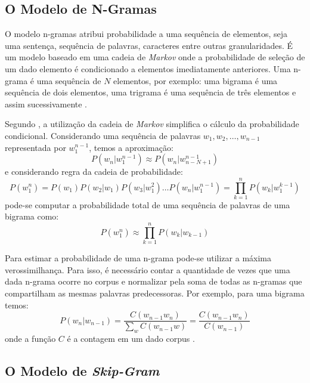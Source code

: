 \subsection{O Modelo de N-Gramas}
\label{sec:n-grama}

O modelo n-gramas atribui probabilidade a uma sequência de elementos, seja uma sentença, sequência de palavras, caracteres entre outras granularidades. É um modelo baseado em uma cadeia de \textit{Markov} onde a probabilidade de seleção de um dado elemento é condicionado a elementos imediatamente anteriores. Uma n-grama é uma sequência de $N$ elementos, por exemplo: uma bigrama é uma sequência de dois elementos, uma trigrama é uma sequência de três elementos e assim sucessivamente \cite{Jurafsky2009Speech}.

Segundo \textcite{Jurafsky2009Speech}, a utilização da cadeia de \textit{Markov} simplifica o cálculo da probabilidade condicional. Considerando uma sequência de palavras $w_1, w_2, \dots, w_{n-1}$ representada por $w_1^{n-1}$, temos a aproximação:
\begin{equation}
    \label{eq:n_gram_approximation}
    P(w_n|w_1^{n-1}) \approx P(w_n|w_{n-N+1}^{n-1})
\end{equation}
e considerando regra da cadeia de probabilidade:
\begin{equation}
    \label{eq:n_gram_chain_rule}
    P(w_1^n) = P(w_1) P(w_2|w_1) P(w_3|w_1^{2}) \dots P(w_n|w_1^{n-1}) = \prod_{k=1}^n P(w_k|w_1^{k-1})
\end{equation}
pode-se computar a probabilidade total de uma sequência de palavras de uma bigrama como:
\begin{equation}
    \label{eq:n_gram_bi_gram}
    P(w_1^n) \approx \prod_{k=1}^n P(w_k|w_{k-1})
\end{equation}

Para estimar a probabilidade de uma n-grama pode-se utilizar a máxima verossimilhança. Para isso, é necessário contar a quantidade de vezes que uma dada n-grama ocorre no corpus e normalizar pela soma de todas as n-gramas que compartilham as mesmas palavras predecessoras. Por exemplo, para uma bigrama temos:
\begin{equation}
    \label{eq:n_gram_bi_gram_probaility}
    P(w_n|w_{n-1}) = \frac{C(w_{n-1}w_n)}{\sum_w C(w_{n-1}w)} = \frac{C(w_{n-1}w_n)}{C(w_{n-1})}
\end{equation}
onde a função $C$ é a contagem em um dado corpus \cite{Jurafsky2009Speech}.

\subsection{O Modelo de \textit{Skip-Gram}}
\label{sec:word-embedding-sg}

